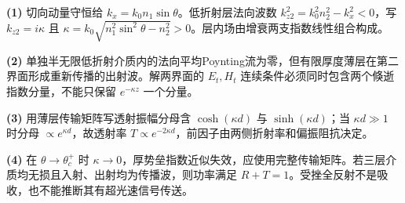 \par\noindent\textbf{(1)} 切向动量守恒给 \(k_x=k_0n_1\sin\theta\)。低折射层法向波数 \(k_{z2}^2=k_0^2n_2^2-k_x^2<0\)，写 \(k_{z2}=i\kappa\) 且 \(\kappa=k_0\sqrt{n_1^2\sin^2\theta-n_2^2}>0\)。层内场由增衰两支指数线性组合构成。
\par\noindent\textbf{(2)} 单独半无限低折射介质内的法向平均Poynting流为零，但有限厚度薄层在第二界面形成重新传播的出射波。解两界面的 \(E_t,H_t\) 连续条件必须同时包含两个倏逝指数分量，不能只保留 \(e^{-\kappa z}\) 一个分量。
\par\noindent\textbf{(3)} 用薄层传输矩阵写透射振幅分母含 \(\cosh(\kappa d)\) 与 \(\sinh(\kappa d)\)；当 \(\kappa d\gg1\) 时分母 \(\propto e^{\kappa d}\)，故透射率 \(T\propto e^{-2\kappa d}\)，前因子由两侧折射率和偏振阻抗决定。
\par\noindent\textbf{(4)} 在 \(\theta\to\theta_c^+\) 时 \(\kappa\to0\)，厚势垒指数近似失效，应使用完整传输矩阵。若三层介质均无损且入射、出射均为传播波，则功率满足 \(R+T=1\)。受挫全反射不是吸收，也不能推断其有超光速信号传送。
